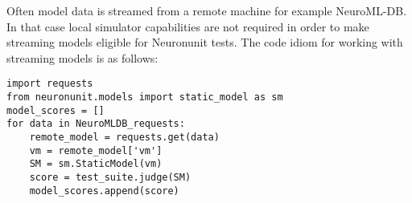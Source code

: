 Often model data is streamed from a remote machine for example NeuroML-DB. In that case local simulator capabilities are not required in order to make streaming models eligible for Neuronunit tests. The code idiom for working with streaming models is as follows:

\begin{verbatim}
import requests
from neuronunit.models import static_model as sm
model_scores = []
for data in NeuroMLDB_requests:
    remote_model = requests.get(data)
    vm = remote_model['vm']
    SM = sm.StaticModel(vm)
    score = test_suite.judge(SM)
    model_scores.append(score)
\end{verbatim}


%
%






